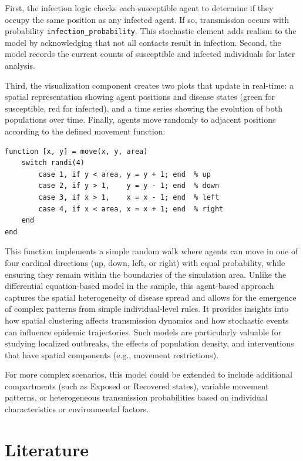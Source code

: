 \documentclass{article}
\begin{document}
First, the infection logic checks each susceptible agent to determine if they occupy the same position as any infected agent. If so, transmission occurs with probability \texttt{infection\_probability}. This stochastic element adds realism to the model by acknowledging that not all contacts result in infection. Second, the model records the current counts of susceptible and infected individuals for later analysis.

Third, the visualization component creates two plots that update in real-time: a spatial representation showing agent positions and disease states (green for susceptible, red for infected), and a time series showing the evolution of both populations over time.
Finally, agents move randomly to adjacent positions according to the defined movement function:

\begin{lstlisting}[caption={Move function)}]
function [x, y] = move(x, y, area)
    switch randi(4)
        case 1, if y < area, y = y + 1; end  % up
        case 2, if y > 1,    y = y - 1; end  % down
        case 3, if x > 1,    x = x - 1; end  % left
        case 4, if x < area, x = x + 1; end  % right
    end
end
\end{lstlisting}

This function implements a simple random walk where agents can move in one of four cardinal directions (up, down, left, or right) with equal probability, while ensuring they remain within the boundaries of the simulation area.
Unlike the differential equation-based model in the sample, this agent-based approach captures the spatial heterogeneity of disease spread and allows for the emergence of complex patterns from simple individual-level rules. It provides insights into how spatial clustering affects transmission dynamics and how stochastic events can influence epidemic trajectories. Such models are particularly valuable for studying localized outbreaks, the effects of population density, and interventions that have spatial components (e.g., movement restrictions).

For more complex scenarios, this model could be extended to include additional compartments (such as Exposed or Recovered states), variable movement patterns, or heterogeneous transmission probabilities based on individual characteristics or environmental factors.

\section{Literature}
\end{document}
